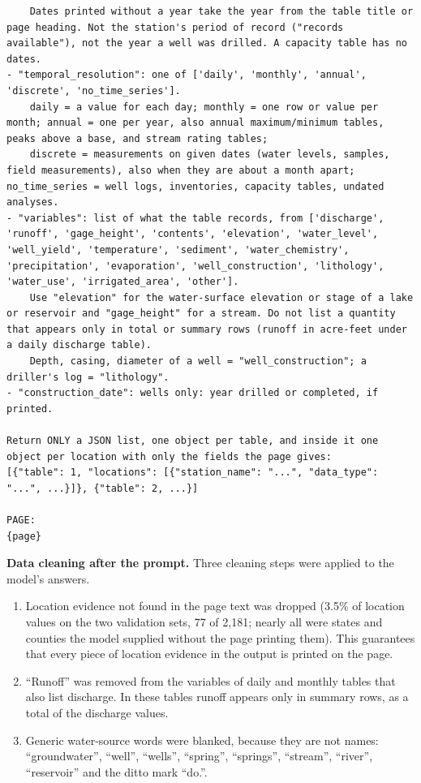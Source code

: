 \begin{lstlisting}
    Dates printed without a year take the year from the table title or page heading. Not the station's period of record ("records available"), not the year a well was drilled. A capacity table has no dates.
- "temporal_resolution": one of ['daily', 'monthly', 'annual', 'discrete', 'no_time_series'].
    daily = a value for each day; monthly = one row or value per month; annual = one per year, also annual maximum/minimum tables, peaks above a base, and stream rating tables;
    discrete = measurements on given dates (water levels, samples, field measurements), also when they are about a month apart; no_time_series = well logs, inventories, capacity tables, undated analyses.
- "variables": list of what the table records, from ['discharge', 'runoff', 'gage_height', 'contents', 'elevation', 'water_level', 'well_yield', 'temperature', 'sediment', 'water_chemistry', 'precipitation', 'evaporation', 'well_construction', 'lithology', 'water_use', 'irrigated_area', 'other'].
    Use "elevation" for the water-surface elevation or stage of a lake or reservoir and "gage_height" for a stream. Do not list a quantity that appears only in total or summary rows (runoff in acre-feet under a daily discharge table).
    Depth, casing, diameter of a well = "well_construction"; a driller's log = "lithology".
- "construction_date": wells only: year drilled or completed, if printed.

Return ONLY a JSON list, one object per table, and inside it one object per location with only the fields the page gives:
[{"table": 1, "locations": [{"station_name": "...", "data_type": "...", ...}]}, {"table": 2, ...}]

PAGE:
{page}
\end{lstlisting}

\textbf{Data cleaning after the prompt.} Three cleaning steps were applied to the model's answers.

\begin{enumerate}
  \item Location evidence not found in the page text was dropped (3.5\% of location values on the two validation sets, 77 of 2,181; nearly all were states and counties the model supplied without the page printing them). This guarantees that every piece of location evidence in the output is printed on the page.
  \item ``Runoff'' was removed from the variables of daily and monthly tables that also list discharge. In these tables runoff appears only in summary rows, as a total of the discharge values.
  \item Generic water-source words were blanked, because they are not names: ``groundwater'', ``well'', ``wells'', ``spring'', ``springs'', ``stream'', ``river'', ``reservoir'' and the ditto mark ``do.''.
\end{enumerate}

